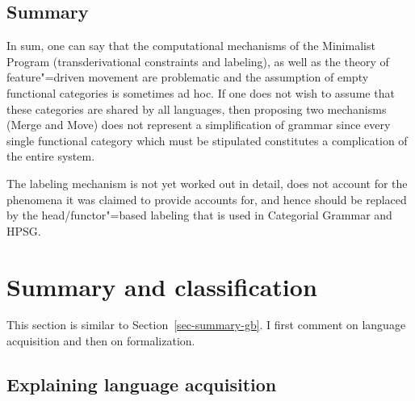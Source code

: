 \subsection{Summary}

In sum, one can say that the computational mechanisms of the Minimalist Program (\eg transderivational 
constraints and labeling), as well as the theory of
feature"=driven movement are problematic and the assumption of empty functional categories is sometimes ad hoc.
If one does not wish to assume that these categories are shared by all languages, then proposing two mechanisms (Merge
and Move) does not represent a simplification of grammar since every single functional category which must be stipulated
constitutes a complication of the entire system.

The labeling mechanism is not yet worked out in detail, does not account for the phenomena it was
claimed to provide accounts for, and hence should be replaced by the head/functor"=based
labeling that is used in Categorial Grammar and HPSG.



\section{Summary and classification}


This section is similar to Section~\ref{sec-summary-gb}. I first comment on language acquisition and
then on formalization.

\subsection{Explaining language acquisition}

